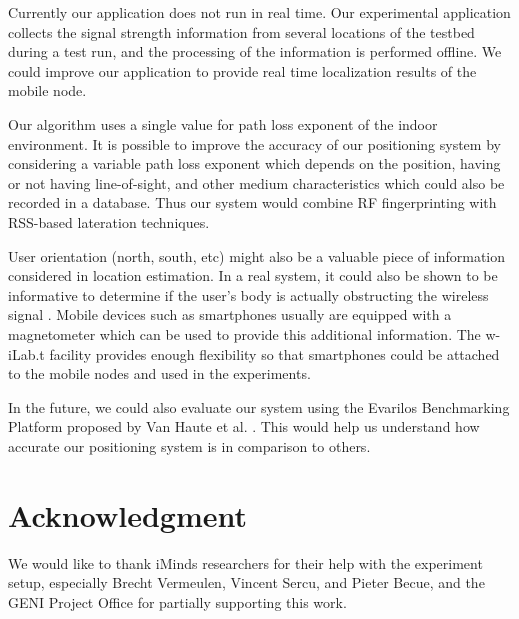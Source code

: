 \documentclass[journal]{IEEEtran} 				\IEEEoverridecommandlockouts 						\usepackage{amsmath,amssymb}
\begin{document}
Currently our application does not run in real time. Our experimental application collects the signal strength information from several locations of the testbed during a test run, and the processing of the information is performed offline. We could improve our application to provide real time localization results of the mobile node.

Our algorithm uses a single  value for path loss exponent of the indoor environment. It is possible to improve the accuracy of our positioning system by considering a variable path loss exponent which depends on the position, having or not having line-of-sight, and other medium characteristics which could also be recorded in a database. Thus our system would combine RF fingerprinting with RSS-based lateration techniques.

User orientation (north, south, etc) might also be a valuable piece of information considered in location estimation. In a real system, it could also be shown to be informative to determine if the user's body is actually obstructing the wireless signal \cite{Bahl_Padmanabhan_2000}. Mobile devices such as smartphones usually are equipped with a magnetometer which can be used to provide this additional information. The w-iLab.t facility provides enough flexibility so that smartphones could be attached to the mobile nodes and used in the experiments.

In the future, we could also evaluate our system using the Evarilos Benchmarking Platform proposed by Van Haute et al. \cite{vanhaute15_platform}. This would help us understand how accurate our positioning system is in comparison to others.

\section*{Acknowledgment}
We would like to thank iMinds researchers for their help with the experiment setup, especially Brecht Vermeulen, Vincent Sercu, and Pieter Becue,
and the GENI Project Office for partially supporting this work.




\end{document}
